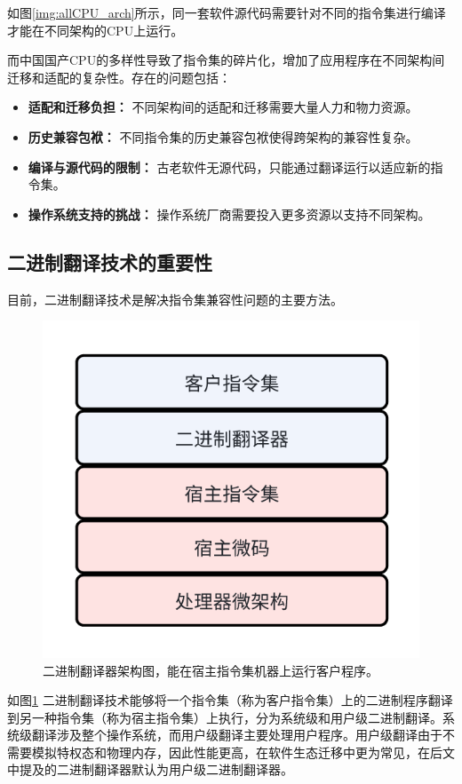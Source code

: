 \documentclass{Style/ucasproposal}%
\begin{document}

如图\ref{img:allCPU_arch}所示，同一套软件源代码需要针对不同的指令集进行编译才能在不同架构的CPU上运行。

    而中国国产CPU的多样性导致了指令集的碎片化，增加了应用程序在不同架构间迁移和适配的复杂性。存在的问题包括：
    \begin{itemize}
    \item \textbf{适配和迁移负担：} 不同架构间的适配和迁移需要大量人力和物力资源。
    
    \item \textbf{历史兼容包袱：} 不同指令集的历史兼容包袱使得跨架构的兼容性复杂。
    
    \item \textbf{编译与源代码的限制：} 古老软件无源代码，只能通过翻译运行以适应新的指令集。
    
    \item \textbf{操作系统支持的挑战：} 操作系统厂商需要投入更多资源以支持不同架构。
    \end{itemize}

\subsection{二进制翻译技术的重要性}
目前，二进制翻译技术是解决指令集兼容性问题的主要方法。

\begin{figure}[h]
    \centering
    \includegraphics[width=0.3\linewidth]{./feishuImage/BT_arch.png}
    \caption{二进制翻译器架构图，能在宿主指令集机器上运行客户程序。}
    \label{img:BT_arch}
  \end{figure}

如图\ref{img:BT_arch} 二进制翻译技术能够将一个指令集（称为客户指令集）上的二进制程序翻译到另一种指令集（称为宿主指令集）上执行，分为系统级和用户级二进制翻译。系统级翻译涉及整个操作系统，而用户级翻译主要处理用户程序。用户级翻译由于不需要模拟特权态和物理内存，因此性能更高，在软件生态迁移中更为常见，在后文中提及的二进制翻译器默认为用户级二进制翻译器。
\end{document}
